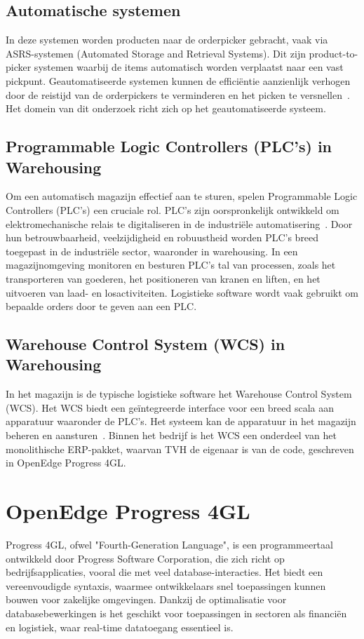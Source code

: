 \subsection{Automatische systemen}
In deze systemen worden producten naar de orderpicker gebracht, vaak via ASRS-systemen (Automated Storage and Retrieval Systems). 
Dit zijn product-to-picker systemen waarbij de items automatisch worden verplaatst naar een vast pickpunt. 
Geautomatiseerde systemen kunnen de efficiëntie aanzienlijk verhogen door de reistijd van de orderpickers te verminderen 
en het picken te versnellen~\autocite{Berg1999}.
Het domein van dit onderzoek richt zich op het geautomatiseerde systeem. 

\subsection{Programmable Logic Controllers (PLC’s) in Warehousing}
Om een automatisch magazijn effectief aan te sturen, spelen Programmable Logic Controllers (PLC's) een cruciale rol.
PLC's zijn oorspronkelijk ontwikkeld om elektromechanische relais te digitaliseren in de industriële automatisering~\autocite{Bolton2015}. 
Door hun betrouwbaarheid, veelzijdigheid en robuustheid worden PLC’s breed toegepast in de industriële sector, waaronder in warehousing. 
In een magazijnomgeving monitoren en besturen PLC's tal van processen, zoals het transporteren van goederen, 
het positioneren van kranen en liften, en het uitvoeren van laad- en losactiviteiten.
Logistieke software wordt vaak gebruikt om bepaalde orders door te geven aan een PLC.

\subsection{Warehouse Control System (WCS) in Warehousing} 
In het magazijn is de typische logistieke software het Warehouse Control System (WCS). 
Het WCS biedt een geïntegreerde interface voor een breed scala aan apparatuur waaronder de PLC's. 
Het systeem kan de apparatuur in het magazijn beheren en aansturen~\autocite{Son2015}. 
Binnen het bedrijf is het WCS een onderdeel van het monolithische ERP-pakket, waarvan TVH de eigenaar is van de code, 
geschreven in OpenEdge Progress 4GL.
 
\section{OpenEdge Progress 4GL} 
Progress 4GL, ofwel "Fourth-Generation Language", is een programmeertaal ontwikkeld door Progress Software Corporation, 
die zich richt op bedrijfsapplicaties, vooral die met veel database-interacties. 
Het biedt een vereenvoudigde syntaxis, waarmee ontwikkelaars snel toepassingen kunnen bouwen voor zakelijke omgevingen.
Dankzij de optimalisatie voor databasebewerkingen is het geschikt voor toepassingen in sectoren als financiën en logistiek, 
waar real-time datatoegang essentieel is.


